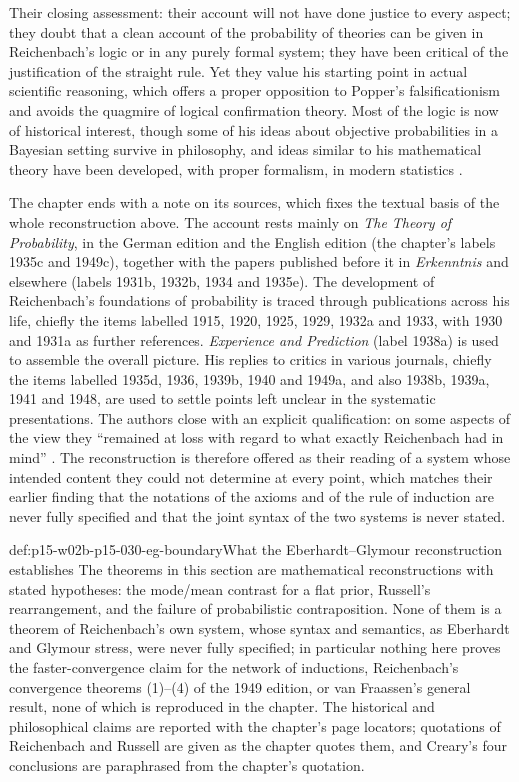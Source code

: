 Their closing assessment: their account will not have done justice to
every aspect; they doubt that a clean account of the probability of
theories can be given in Reichenbach's logic or in any purely formal
system; they have been critical of the justification of the straight
rule. Yet they value his starting point in actual scientific reasoning,
which offers a proper opposition to Popper's falsificationism and avoids
the quagmire of logical confirmation theory. Most of the logic is now of
historical interest, though some of his ideas about objective
probabilities in a Bayesian setting survive in philosophy, and ideas
similar to his mathematical theory have been developed, with proper
formalism, in modern statistics
\cite[p.~387]{EberhardtGlymour2011ReichenbachReading}.

The chapter ends with a note on its sources, which fixes the textual
basis of the whole reconstruction above. The account rests mainly on
\emph{The Theory of Probability}, in the German edition and the English
edition (the chapter's labels 1935c and 1949c), together with the papers
published before it in \emph{Erkenntnis} and elsewhere (labels 1931b,
1932b, 1934 and 1935e). The development of Reichenbach's foundations of
probability is traced through publications across his life, chiefly the
items labelled 1915, 1920, 1925, 1929, 1932a and 1933, with 1930 and 1931a
as further references. \emph{Experience and Prediction} (label 1938a) is
used to assemble the overall picture. His replies to critics in various
journals, chiefly the items labelled 1935d, 1936, 1939b, 1940 and 1949a,
and also 1938b, 1939a, 1941 and 1948, are used to settle points left
unclear in the systematic presentations. The authors close with an
explicit qualification: on some aspects of the view they
\enquote{remained at loss with regard to what exactly Reichenbach had in
mind} \cite[p.~387]{EberhardtGlymour2011ReichenbachReading}. The
reconstruction is therefore offered as their reading of a system whose
intended content they could not determine at every point, which matches
their earlier finding that the notations of the axioms and of the rule
of induction are never fully specified and that the joint syntax of the
two systems is never stated.

\begin{proofboundary}{def:p15-w02b-p15-030-eg-boundary}{What the Eberhardt--Glymour reconstruction establishes}
The theorems in this section are mathematical reconstructions with
stated hypotheses: the mode/mean contrast for a flat prior, Russell's rearrangement, and the failure of probabilistic
contraposition. None of them is a theorem of Reichenbach's own system,
whose syntax and semantics, as Eberhardt and Glymour stress, were never fully
specified; in particular nothing here proves the faster-convergence claim
for the network of inductions, Reichenbach's convergence theorems
(1)--(4) of the 1949 edition, or van Fraassen's general result, none of
which is reproduced in the chapter. The historical and philosophical
claims are reported with the chapter's page locators; quotations of
Reichenbach and Russell are given as the chapter quotes them, and
Creary's four conclusions are paraphrased from the chapter's quotation.
\end{proofboundary}

